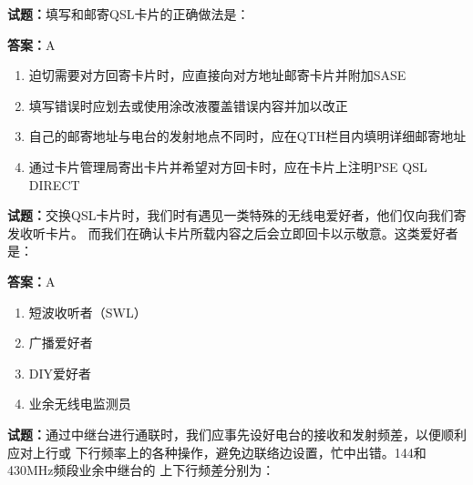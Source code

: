 \documentclass{ctexbook}
\begin{document}




\vspace{1em}

\textbf{试题：}填写和邮寄QSL卡片的正确做法是： 

\textbf{答案：}A 

\begin{enumerate}[leftmargin=3em]
  \item 迫切需要对方回寄卡片时，应直接向对方地址邮寄卡片并附加SASE 

  \item 填写错误时应划去或使用涂改液覆盖错误内容并加以改正 

  \item 自己的邮寄地址与电台的发射地点不同时，应在QTH栏目内填明详细邮寄地址 

  \item 通过卡片管理局寄出卡片并希望对方回卡时，应在卡片上注明PSE QSL DIRECT 

\end{enumerate}





\vspace{1em}

\textbf{试题：}交换QSL卡片时，我们时有遇见一类特殊的无线电爱好者，他们仅向我们寄发收听卡片。
而我们在确认卡片所载内容之后会立即回卡以示敬意。这类爱好者是： 

\textbf{答案：}A 

\begin{enumerate}[leftmargin=3em]
  \item 短波收听者（SWL） 

  \item 广播爱好者 

  \item DIY爱好者 

  \item 业余无线电监测员 

\end{enumerate}





\vspace{1em}

\textbf{试题：}通过中继台进行通联时，我们应事先设好电台的接收和发射频差，以便顺利应对上行或
下行频率上的各种操作，避免边联络边设置，忙中出错。144和430MHz频段业余中继台的
上下行频差分别为： 
\end{document}

